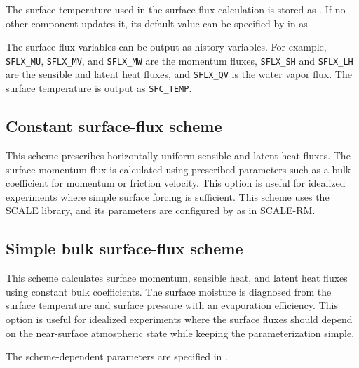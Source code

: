 The surface temperature used in the surface-flux calculation is stored as .
If no other component updates it, its default value can be specified by  in  as 

The surface flux variables can be output as history variables.
For example, \verb|SFLX_MU|, \verb|SFLX_MV|, and \verb|SFLX_MW| are
the momentum fluxes, \verb|SFLX_SH| and \verb|SFLX_LH| are the sensible
and latent heat fluxes, and \verb|SFLX_QV| is the water vapor flux.
The surface temperature is output as \verb|SFC_TEMP|.


\subsection{Constant surface-flux scheme}
\label{subsec:physics_sf_const}
This scheme prescribes horizontally uniform sensible and latent heat fluxes.
The surface momentum flux is calculated using prescribed parameters such as a bulk coefficient for momentum or friction velocity.
This option is useful for idealized experiments where simple surface forcing is sufficient.
This scheme uses the SCALE library, 
and its parameters are configured by  as in SCALE-RM.


\subsection{Simple bulk surface-flux scheme}
\label{subsec:physics_sf_simple}
This scheme calculates surface momentum, sensible heat, and latent heat fluxes using constant bulk coefficients.
The surface moisture is diagnosed from the surface temperature and surface pressure with an evaporation efficiency.
This option is useful for idealized experiments where the surface fluxes should depend on the near-surface atmospheric state 
while keeping the parameterization simple.

The scheme-dependent parameters are specified in .
